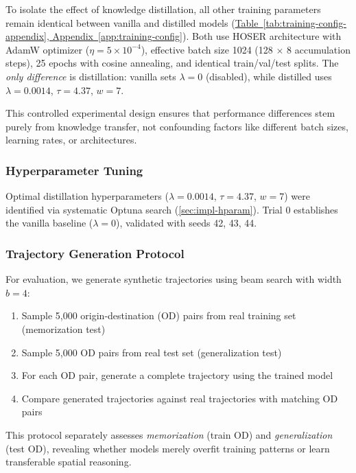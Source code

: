 To isolate the effect of knowledge distillation, all other training parameters remain identical between vanilla and distilled models (\hyperref[app:training-config]{Table~\ref*{tab:training-config-appendix}, Appendix~\ref*{app:training-config}}). Both use HOSER architecture with AdamW optimizer ($\eta = 5 \times 10^{-4}$), effective batch size 1024 (128 $\times$ 8 accumulation steps), 25 epochs with cosine annealing, and identical train/val/test splits. The \emph{only difference} is distillation: vanilla sets $\lambda = 0$ (disabled), while distilled uses $\lambda = 0.0014$, $\tau = 4.37$, $w = 7$.

This controlled experimental design ensures that performance differences stem purely from knowledge transfer, not confounding factors like different batch sizes, learning rates, or architectures.

\subsubsection{Hyperparameter Tuning}

Optimal distillation hyperparameters ($\lambda = 0.0014$, $\tau = 4.37$, $w = 7$) were identified via systematic Optuna search (\autoref{sec:impl-hparam}). Trial 0 establishes the vanilla baseline ($\lambda = 0$), validated with seeds 42, 43, 44.

\subsubsection{Trajectory Generation Protocol}

For evaluation, we generate synthetic trajectories using beam search with width $b = 4$:

\begin{enumerate}[noitemsep,topsep=0pt]
\item Sample 5,000 origin-destination (OD) pairs from real training set (memorization test)
\item Sample 5,000 OD pairs from real test set (generalization test)
\item For each OD pair, generate a complete trajectory using the trained model
\item Compare generated trajectories against real trajectories with matching OD pairs
\end{enumerate}

This protocol separately assesses \emph{memorization} (train OD) and \emph{generalization} (test OD), revealing whether models merely overfit training patterns or learn transferable spatial reasoning.

